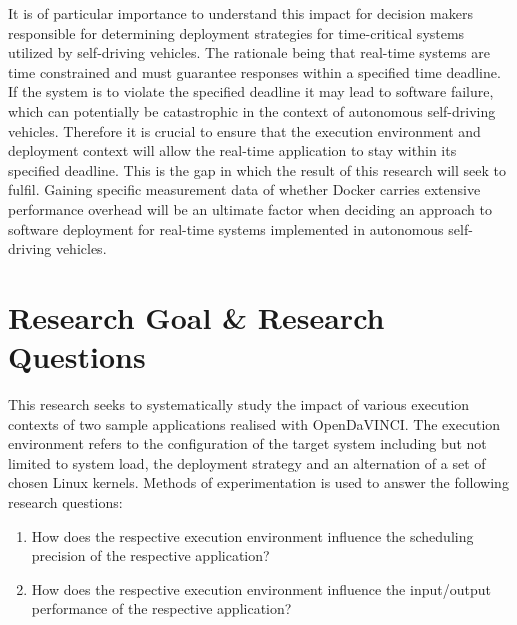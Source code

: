 It is of particular importance to understand this impact for decision makers responsible for determining deployment strategies for time-critical systems utilized by self-driving vehicles. The rationale being that real-time systems are time constrained and must guarantee responses within a specified time deadline. If the system is to violate the specified deadline it may lead to software failure, which can potentially be catastrophic in the context of autonomous self-driving vehicles. Therefore it is crucial to ensure that the execution environment and deployment context will allow the real-time application to stay within its specified deadline. This is the gap in which the result of this research will seek to fulfil. Gaining specific measurement data of whether Docker carries extensive performance overhead will be an ultimate factor when deciding an approach to software deployment for real-time systems implemented in autonomous self-driving vehicles.\\

\section{Research Goal \& Research Questions}
This research seeks to systematically study the impact of various execution contexts of two sample applications realised with OpenDaVINCI. The execution environment refers to the configuration of the target system including but not limited to system load, the deployment strategy and an alternation of a set of chosen Linux kernels. Methods of experimentation is used to answer the following research questions:\\

\begin{enumerate}[label=\textbf{RQ\arabic*}]
\label{section:rqs}
	\item How does the respective execution environment influence the scheduling precision of the respective application?
	\item How does the respective execution environment influence the input/output performance of the respective application?\\
\end{enumerate}





